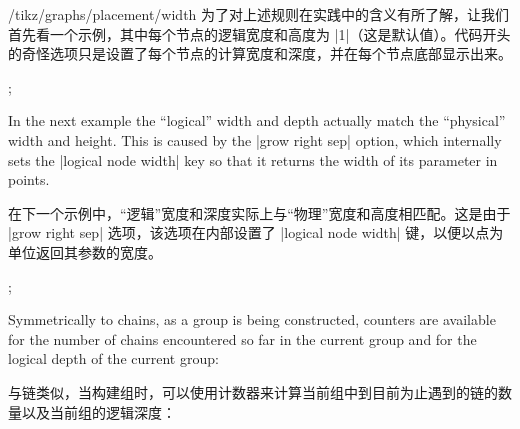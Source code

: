 \begin{key}{/tikz/graphs/placement/width}
    为了对上述规则在实践中的含义有所了解，让我们首先看一个示例，其中每个节点的逻辑宽度和高度为 |1|（这是默认值）。代码开头的奇怪选项只是设置了每个节点的计算宽度和深度，并在每个节点底部显示出来。

\begin{codeexample}[preamble={\usetikzlibrary{graphs}}]
\tikz
  ;
\end{codeexample}
    In the next example the ``logical'' width and depth actually match the
    ``physical'' width and height. This is caused by the |grow right sep|
    option, which internally sets the |logical node width| key so that it
    returns the width of its parameter in points.
     
    在下一个示例中，“逻辑”宽度和深度实际上与“物理”宽度和高度相匹配。这是由于 |grow right sep| 选项，该选项在内部设置了 |logical node width| 键，以便以点为单位返回其参数的宽度。

    \begin{codeexample}[preamble={\usetikzlibrary{graphs}}]
\tikz
  ;
\end{codeexample}
\end{key}

Symmetrically to chains, as a group is being constructed, counters are
available for the number of chains encountered so far in the current group and
for the logical depth of the current group:

与链类似，当构建组时，可以使用计数器来计算当前组中到目前为止遇到的链的数量以及当前组的逻辑深度：


